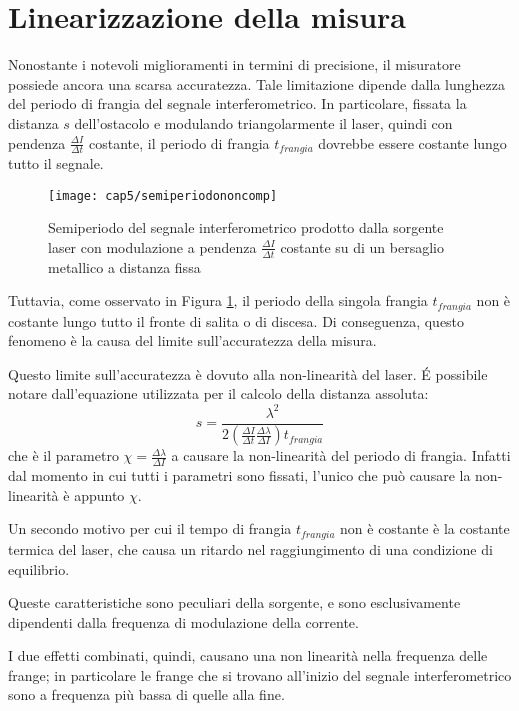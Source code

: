 \section{Linearizzazione della misura}
Nonostante i notevoli miglioramenti in termini di precisione, il misuratore possiede ancora una scarsa accuratezza. Tale limitazione dipende dalla lunghezza del periodo di frangia del segnale interferometrico. In particolare, fissata la distanza $s$ dell'ostacolo e modulando triangolarmente il laser, quindi con pendenza $\frac{\Delta I}{\Delta t}$ costante, il periodo di frangia $t_{frangia}$ dovrebbe essere costante lungo tutto il segnale. 
\begin{figure}  
  \begin{center}
    \texttt{[image: cap5/semiperiodononcomp]}
    \caption{Semiperiodo del segnale interferometrico prodotto dalla sorgente laser con modulazione a pendenza $\frac{\Delta I}{\Delta t}$ costante su di un bersaglio metallico a distanza fissa}
    \label{semiperiodononcomp}
  \end{center}
\end{figure}

Tuttavia, come osservato in Figura \ref{semiperiodononcomp}, il periodo della singola frangia $t_{frangia}$ non è costante lungo tutto il fronte di salita o di discesa. Di conseguenza, questo fenomeno è la causa del limite sull'accuratezza della misura.

Questo limite sull'accuratezza è dovuto alla non-linearità del laser. \'E possibile notare dall'equazione utilizzata per il calcolo della distanza assoluta: 
\begin{equation}
	s = \frac{\lambda^2}{2\left ( \frac{\Delta I}{\Delta t} \frac{\Delta \lambda}{\Delta I} \right ) t_{frangia}} 
\end{equation}
che è il parametro $\chi = \frac{\Delta \lambda}{\Delta I}$ a causare la non-linearità del periodo di frangia. Infatti dal momento in cui tutti i parametri sono fissati, l'unico che può causare la non-linearità è appunto $\chi$.

Un secondo motivo per cui il tempo di frangia $t_{frangia}$ non è costante è la costante termica del laser, che causa un ritardo nel raggiungimento di una condizione di equilibrio.

Queste caratteristiche sono peculiari della sorgente, e sono esclusivamente dipendenti dalla frequenza di modulazione della corrente.	

I due effetti combinati, quindi, causano una non linearità nella frequenza delle frange; in particolare le frange che si trovano all'inizio del segnale interferometrico sono a frequenza più bassa di quelle alla fine.	


